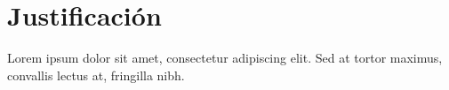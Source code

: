 \section{Justificación}
Lorem ipsum dolor sit amet, consectetur adipiscing elit. Sed at tortor maximus, convallis lectus at, fringilla nibh.

